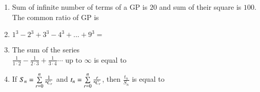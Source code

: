 \documentclass[journal,12pt,twocolumn]{IEEEtran}
\theoremstyle{remark}
\begin{document}
\begin{enumerate}[label={\arabic*.}]
\item {Sum of infinite number of terms of a GP is $20$ and sum of their square is $100$. The common ratio of GP is}
{\hfill{}} 
\begin{enumerate}
\end{enumerate} 

\item {$1^{3}-2^{3}+3^{3}-4^{3}+...
+9^{3}=$}
{\hfill{}} 
\begin{enumerate}
\end{enumerate}

\item {The sum of the series \\ $\frac{1}{1\cdot2}-\frac{1}{2\cdot3}+\frac{1}{3\cdot4}\cdots \text{ up to } \infty$ is equal to} 
{\hfill{}} 
\begin{enumerate}
\end{enumerate}

\item {If $S_n = \sum\limits_{r=0}^{n} \frac{1}{{{}^{n}\mkern-1muC_{r}}}$ and $t_n = \sum\limits_{r=0}^{n} \frac{r}{{{}^{n}\mkern-1muC_{r}}}$, then $\frac{t_n}{S_n}$ is equal to}
{\hfill{}} 
\begin{enumerate}
\end{enumerate}


\end{enumerate}
\end{document}
